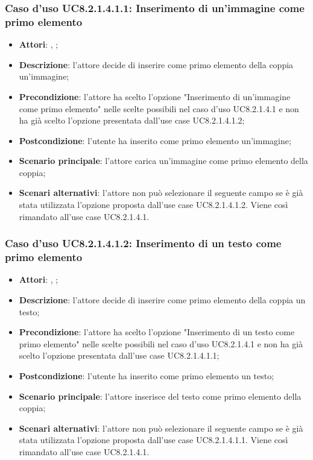 		\subsubsection{Caso d'uso UC8.2.1.4.1.1: Inserimento di un'immagine come primo elemento}
		\label{UC8.2.1.4.1.1}
		\begin{itemize}
			\item \textbf{Attori}: \uau, \uaupro;
			\item \textbf{Descrizione}: l'attore decide di inserire come primo elemento della coppia un'immagine;
			\item \textbf{Precondizione}: l'attore ha scelto l'opzione "Inserimento di un'immagine come primo elemento" nelle scelte possibili nel caso d'uso UC8.2.1.4.1 e non ha già scelto l'opzione presentata dall'use case UC8.2.1.4.1.2;
			\item \textbf{Postcondizione}: l'utente ha inserito come primo elemento un'immagine;
			\item \textbf{Scenario principale}: l'attore carica un'immagine come primo elemento della coppia;  
			\item \textbf{Scenari alternativi}: l'attore non può selezionare il seguente campo se è già stata utilizzata l'opzione proposta dall'use case UC8.2.1.4.1.2. Viene così rimandato all'use case UC8.2.1.4.1.
		\end{itemize}
		
		\subsubsection{Caso d'uso UC8.2.1.4.1.2: Inserimento di un testo come primo elemento}
		\label{UC8.2.1.4.1.2}
		\begin{itemize}
			\item \textbf{Attori}: \uau, \uaupro;
			\item \textbf{Descrizione}: l'attore decide di inserire come primo elemento della coppia un testo;
			\item \textbf{Precondizione}: l'attore ha scelto l'opzione "Inserimento di un testo come primo elemento" nelle scelte possibili nel caso d'uso UC8.2.1.4.1 e non ha già scelto l'opzione presentata dall'use case UC8.2.1.4.1.1;
			\item \textbf{Postcondizione}: l'utente ha inserito come primo elemento un testo;
			\item \textbf{Scenario principale}: l'attore inserisce del testo come primo elemento della coppia;  
			\item \textbf{Scenari alternativi}: l'attore non può selezionare il seguente campo se è già stata utilizzata l'opzione proposta dall'use case UC8.2.1.4.1.1. Viene così rimandato all'use case UC8.2.1.4.1.
		\end{itemize}
		
